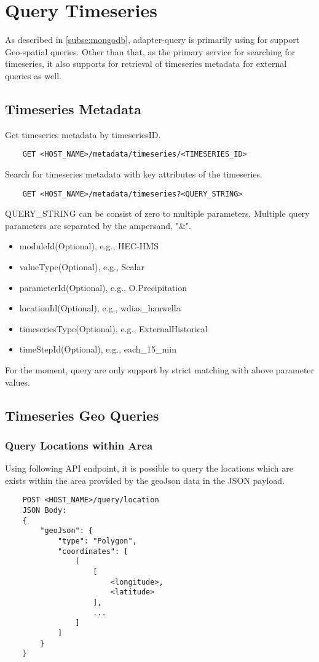 \section{Query Timeseries}

As described in  \ref{subse:mongodb}, adapter-query is primarily using for support Geo-spatial queries. Other than that, as the primary service for searching for timeseries, it also supports for retrieval of timeseries metadata for external queries as well.

\subsection{Timeseries Metadata}
Get timeseries metadata by timeseriesID.
\begin{lstlisting}
    GET <HOST_NAME>/metadata/timeseries/<TIMESERIES_ID>
\end{lstlisting}

Search for timeseries metadata with key attributes of the timeseries.
\begin{lstlisting}
    GET <HOST_NAME>/metadata/timeseries?<QUERY_STRING>
\end{lstlisting}
QUERY\_STRING can be consist of zero to multiple parameters. Multiple query parameters are separated by the ampersand, "\&".
\begin{itemize}
    \item moduleId(Optional), e.g., HEC-HMS
    \item valueType(Optional), e.g., Scalar
    \item parameterId(Optional), e.g., O.Precipitation
    \item locationId(Optional), e.g., wdias\_hanwella
    \item timeseriesType(Optional), e.g., ExternalHistorical
    \item timeStepId(Optional), e.g., each\_15\_min
\end{itemize}
For the moment, query are only support by strict matching with above parameter values.

\subsection{Timeseries Geo Queries}

\subsubsection{Query Locations within Area}
Using following API endpoint, it is possible to query the locations which are exists within the area provided by the geoJson data in the JSON payload.
\begin{lstlisting}
    POST <HOST_NAME>/query/location
    JSON Body:
    {
        "geoJson": {
            "type": "Polygon",
            "coordinates": [
                [
                    [
                        <longitude>,
                        <latitude>
                    ],
                    ...
                ]
            ]
        }
    }
\end{lstlisting}

